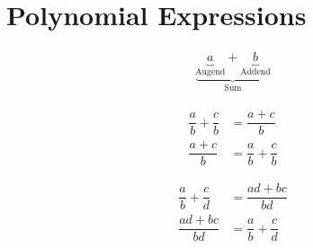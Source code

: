 



\section{Polynomial Expressions}

\begin{definition}
\begin{align}
\underbrace{\underbrace{a}_{\text{Augend}}+\underbrace{b}_{\text{Addend}}}_{\text{Sum}} \label{eq:ooa}
\end{align}
\end{definition}


\begin{definition}
\begin{subequations}
\begin{align}
\dfrac{a}{b} + \dfrac{c}{b} &= \dfrac{a+c}{b} \label{eq:cd1} \\
\dfrac{a+c}{b}&= \dfrac{a}{b} + \dfrac{c}{b} \label{eq:cd2}
\end{align}
\end{subequations}
\end{definition}

\begin{arule}
\begin{subequations}
\begin{align}
\dfrac{a}{b} + \dfrac{c}{d} &= \dfrac{ad+bc}{bd} \label{eq:fooa1} \\
\dfrac{ad+bc}{bd} &= \dfrac{a}{b} + \dfrac{c}{d} \label{eq:fooa2}
\end{align}
\end{subequations}
\end{arule}


